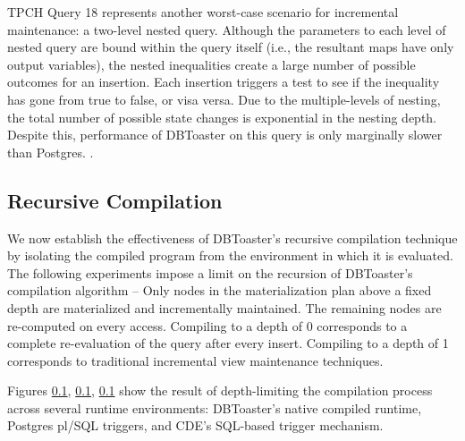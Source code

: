 TPCH Query 18 represents another worst-case scenario for incremental maintenance: a two-level nested query.  Although the parameters to each level of nested query are bound within the query itself (i.e., the resultant maps have only output variables), the nested inequalities create a large number of possible outcomes for an insertion.  Each insertion triggers a test to see if the inequality has gone from true to false, or visa versa.  Due to the multiple-levels of nesting, the total number of possible state changes is exponential in the nesting depth.  Despite this, performance of DBToaster on this query is only marginally slower than Postgres. .





\subsection{Recursive Compilation}
We now establish the effectiveness of DBToaster's recursive compilation technique by isolating the compiled program from the environment in which it is evaluated.  The following experiments impose a limit on the recursion of DBToaster's compilation algorithm -- Only nodes in the materialization plan above a fixed depth are materialized and incrementally maintained.  The remaining nodes are re-computed on every access.  Compiling to a depth of 0 corresponds to a complete re-evaluation of the query after every insert.  Compiling to a depth of 1  corresponds to traditional incremental view maintenance techniques.  

Figures \ref{}, \ref{}, \ref{} show the result of depth-limiting the compilation process across several runtime environments: DBToaster's native compiled runtime, Postgres pl/SQL triggers, and CDE's SQL-based trigger mechanism.

